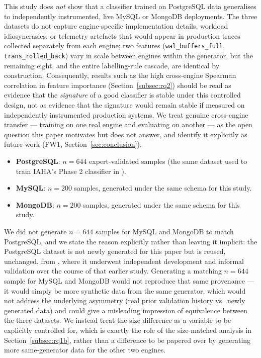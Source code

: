 \documentclass[iicol,pdflatex,sn-mathphys-num]{sn-jnl}
\theoremstyle{thmstyleone}
\theoremstyle{thmstylethree}
\begin{document}
This study does \emph{not} show that a classifier trained on
PostgreSQL data generalises to independently instrumented, live
MySQL or MongoDB deployments. The three datasets do not capture
engine-specific implementation details, workload idiosyncrasies, or
telemetry artefacts that would appear in production traces collected
separately from each engine; two features
(\texttt{wal\_buffers\_full}, \texttt{trans\_rolled\_back}) vary in
scale between engines within the generator, but the remaining eight,
and the entire labelling-rule cascade, are identical by construction.
Consequently, results such as the high cross-engine Spearman
correlation in feature importance (Section~\ref{subsec:rq2}) should
be read as evidence that the \emph{signature} of a good classifier is
stable under this controlled design, not as evidence that the
signature would remain stable if measured on independently
instrumented production systems. We treat genuine cross-engine
transfer --- training on one real engine and evaluating on
another --- as the open question this paper motivates but does not
answer, and identify it explicitly as future work (FW1,
Section~\ref{sec:conclusion}).

\begin{itemize}
\item \textbf{PostgreSQL}: $n = 644$ expert-validated samples
  (the same dataset used to train IAHA's Phase 2 classifier
  in \cite{iaha2026}).
\item \textbf{MySQL}: $n = 200$ samples, generated under the same
  schema for this study.
\item \textbf{MongoDB}: $n = 200$ samples, generated under the same
  schema for this study.
\end{itemize}

We did not generate $n=644$ samples for MySQL and MongoDB to match
PostgreSQL, and we state the reason explicitly rather than leaving it
implicit: the PostgreSQL dataset is not newly generated for this
paper but is reused, unchanged, from \cite{iaha2026}, where it
underwent independent development and informal validation over the
course of that earlier study. Generating a matching $n=644$ sample
for MySQL and MongoDB would not reproduce that same provenance --- it
would simply be more synthetic data from the same generator, which
would not address the underlying asymmetry (real prior validation
history vs.\ newly generated data) and could give a misleading
impression of equivalence between the three datasets. We instead
treat the size difference as a variable to be explicitly controlled
for, which is exactly the role of the size-matched analysis in
Section~\ref{subsec:rq1b}, rather than a difference to be papered
over by generating more same-generator data for the other two
engines.
\end{document}
